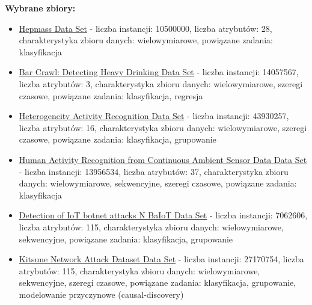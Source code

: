 \documentclass{article}
\begin{document}
\begin{itemize}
    \textbf{Wybrane zbiory:}
    \begin{itemize}
        \item \href{https://archive.ics.uci.edu/ml/datasets/HEPMASS}{Hepmass Data Set} - liczba instancji: 10500000, liczba atrybutów: 28, charakterystyka zbioru danych: wielowymiarowe, powiązane zadania: klasyfikacja  %
        \item \href{https://archive.ics.uci.edu/ml/datasets/Bar+Crawl%3A+Detecting+Heavy+Drinking}{Bar Crawl: Detecting Heavy Drinking Data Set} - liczba instancji: 14057567, liczba atrybutów: 3, charakterystyka zbioru danych: wielowymiarowe, szeregi czasowe, powiązane zadania: klasyfikacja, regresja %
        \item \href{https://archive.ics.uci.edu/ml/datasets/Heterogeneity+Activity+Recognition}{Heterogeneity Activity Recognition Data Set} - liczba instancji: 43930257, liczba atrybutów: 16, charakterystyka zbioru danych: wielowymiarowe, szeregi czasowe, powiązane zadania: klasyfikacja, grupowanie %
        \item \href{https://archive.ics.uci.edu/ml/datasets/Human+Activity+Recognition+from+Continuous+Ambient+Sensor+Data}{Human Activity Recognition from Continuous Ambient Sensor Data Data Set} - liczba instancji: 13956534, liczba atrybutów: 37, charakterystyka zbioru danych: wielowymiarowe, sekwencyjne, szeregi czasowe, powiązane zadania: klasyfikacja %
        \item \href{https://archive.ics.uci.edu/ml/datasets/detection_of_IoT_botnet_attacks_N_BaIoT}{Detection of IoT botnet attacks N BaIoT Data Set} - liczba instancji: 7062606, liczba atrybutów: 115, charakterystyka zbioru danych: wielowymiarowe, sekwencyjne, powiązane zadania: klasyfikacja, grupowanie %
        \item \href{https://archive.ics.uci.edu/ml/datasets/Kitsune+Network+Attack+Dataset}{Kitsune Network Attack Dataset Data Set} - liczba instancji: 27170754, liczba atrybutów: 115, charakterystyka zbioru danych: wielowymiarowe, sekwencyjne, szeregi czasowe, powiązane zadania: klasyfikacja, grupowanie, modelowanie przyczynowe (causal-discovery) %

\end{itemize}
\end{itemize}
\end{document}
